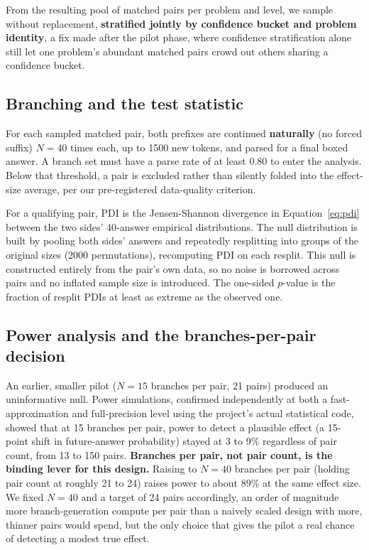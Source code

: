 \documentclass{article}
\begin{document}
From the resulting pool of matched pairs per problem and level, we sample without replacement, \textbf{stratified jointly by confidence bucket and problem identity}, a fix made after the pilot phase, where confidence stratification alone still let one problem's abundant matched pairs crowd out others sharing a confidence bucket.

\subsection{Branching and the test statistic}
\label{sec:method-branching}

For each sampled matched pair, both prefixes are continued \textbf{naturally} (no forced suffix) $N=40$ times each, up to 1500 new tokens, and parsed for a final boxed answer. A branch set must have a parse rate of at least 0.80 to enter the analysis. Below that threshold, a pair is excluded rather than silently folded into the effect-size average, per our pre-registered data-quality criterion.

For a qualifying pair, PDI is the Jensen-Shannon divergence in Equation~\ref{eq:pdi} between the two sides' 40-answer empirical distributions. The null distribution is built by pooling both sides' answers and repeatedly resplitting into groups of the original sizes (2000 permutations), recomputing PDI on each resplit. This null is constructed entirely from the pair's own data, so no noise is borrowed across pairs and no inflated sample size is introduced. The one-sided $p$-value is the fraction of resplit PDIs at least as extreme as the observed one.

\subsection{Power analysis and the branches-per-pair decision}
\label{sec:method-power}

An earlier, smaller pilot ($N=15$ branches per pair, 21 pairs) produced an uninformative null. Power simulations, confirmed independently at both a fast-approximation and full-precision level using the project's actual statistical code, showed that at 15 branches per pair, power to detect a plausible effect (a 15-point shift in future-answer probability) stayed at 3 to 9\% regardless of pair count, from 13 to 150 pairs. \textbf{Branches per pair, not pair count, is the binding lever for this design.} Raising to $N=40$ branches per pair (holding pair count at roughly 21 to 24) raises power to about 89\% at the same effect size. We fixed $N=40$ and a target of 24 pairs accordingly, an order of magnitude more branch-generation compute per pair than a naively scaled design with more, thinner pairs would spend, but the only choice that gives the pilot a real chance of detecting a modest true effect.
\end{document}
